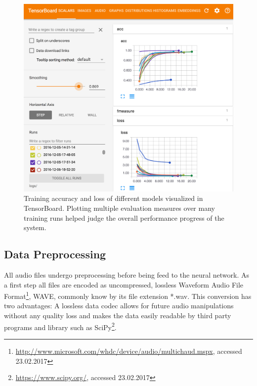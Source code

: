 	\begin{figure}[]
  		\centering
    	\includegraphics[width=\textwidth,keepaspectratio]{img/tensorboard.png}
    	\caption{Training accuracy and loss of different models visualized in TensorBoard. Plotting multiple evaluation measures over many training runs helped judge the overall performance progress of the system.}
    	\label{fig:tensorboard}
	\end{figure}		
	
\subsection{Data Preprocessing}
\label{sec:data_processing}
All audio files undergo preprocessing before being feed to the neural network. As a first step all files are encoded as uncompressed, lossless Waveform Audio File Format\footnote{\url{http://www.microsoft.com/whdc/device/audio/multichaud.mspx}, accessed 23.02.2017}, WAVE, commonly know by its file extension *.wav. This conversion has two advantages: A lossless data codec allows for future audio manipulations without any quality loss and makes the data easily readable by third party programs and library such as SciPy\footnote{\url{https://www.scipy.org/}, accessed 23.02.2017}. 

